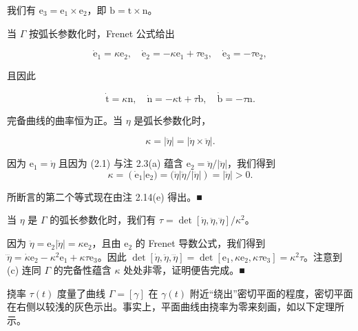 \begin{remark}

\begin{items}
\item

我们有 $ \mathrm{e}_{3} = \mathrm{e}_{1} \times \mathrm{e}_{2} $，即 $ \mathrm{b} = \mathrm{t} \times \mathrm{n} $。

\item

当 $ \Gamma $ 按弧长参数化时，Frenet 公式给出

\[
\dot{\mathrm{e}}_{1} = \kappa\mathrm{e}_{2} , \quad \dot{\mathrm{e}}_{2} = -\kappa\mathrm{e}_{1} + \tau\mathrm{e}_{3} , \quad \dot{\mathrm{e}}_{3} = -\tau\mathrm{e}_{2} ,
\]

且因此

\[
\dot{\mathrm{t}} = \kappa\mathrm{n} , \quad \dot{\mathrm{n}} = -\kappa\mathrm{t} + \tau\mathrm{b} , \quad \dot{\mathrm{b}} = -\tau\mathrm{n} .
\]
\item

完备曲线的曲率恒为正。当 $ \eta $ 是弧长参数化时，

\[
\kappa = |\ddot{\eta}| = |\dot{\eta} \times \ddot{\eta}| .
\]

\proofhead
因为 $ \mathrm{e}_{1} = \dot{\eta} $ 且因为 (2.1) 与注 2.3(a) 蕴含 $ \mathrm{e}_{2} = \ddot{\eta}/|\ddot{\eta}| $，我们得到
\[
\kappa = (\dot{\mathrm{e}}_{1}|\mathrm{e}_{2}) = (\ddot{\eta}|\ddot{\eta}/|\ddot{\eta}|) = |\ddot{\eta}| > 0 .
\]

所断言的第二个等式现在由注 2.14(e) 得出。\nobreak\hspace{0.35em}■

\item

当 $ \eta $ 是 $ \Gamma $ 的弧长参数化时，我们有 $ \tau = \det[\dot{\eta}, \ddot{\eta}, \dddot{\eta}]/\kappa^{2} $。

\proofhead
因为 $ \ddot{\eta} = \mathrm{e}_{2}|\ddot{\eta}| = \kappa\mathrm{e}_{2} $，且由 $ \mathrm{e}_{2} $ 的 Frenet 导数公式，我们得到 $ \dddot{\eta} = \dot{\kappa}\mathrm{e}_{2} - \kappa^{2}\mathrm{e}_{1} + \kappa\tau\mathrm{e}_{3} $。因此 $ \det[\dot{\eta}, \ddot{\eta}, \dddot{\eta}] = \det[\mathrm{e}_{1}, \kappa\mathrm{e}_{2}, \kappa\tau\mathrm{e}_{3}] = \kappa^{2}\tau $。注意到 (c) 连同 $ \Gamma $ 的完备性蕴含 $ \kappa $ 处处非零，证明便告完成。\nobreak\hspace{0.35em}■
\end{items}

挠率 $ \tau(t) $ 度量了曲线 $ \Gamma = [\gamma] $ 在 $ \gamma(t) $ 附近“绕出”密切平面的程度，密切平面在右侧以较浅的灰色示出。事实上，平面曲线由挠率为零来刻画，如以下定理所示。

\end{remark}

